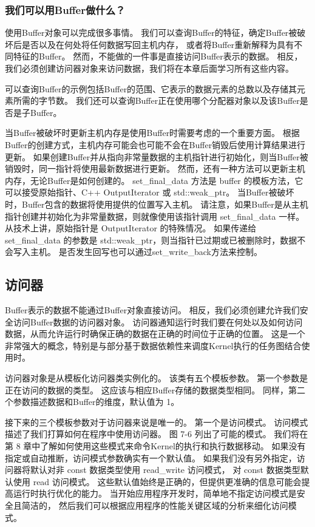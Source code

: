 \subsubsection{我们可以用Buffer做什么？}
使用Buffer对象可以完成很多事情。 我们可以查询Buffer的特征，确定Buffer被破坏后是否以及在何处将任何数据写回主机内存，
或者将Buffer重新解释为具有不同特征的Buffer。 然而，不能做的一件事是直接访问Buffer表示的数据。 
相反，我们必须创建访问器对象来访问数据，我们将在本章后面学习所有这些内容。

可以查询Buffer的示例包括Buffer的范围、它表示的数据元素的总数以及存储其元素所需的字节数。 
我们还可以查询Buffer正在使用哪个分配器对象以及该Buffer是否是子Buffer。

当Buffer被破坏时更新主机内存是使用Buffer时需要考虑的一个重要方面。 
根据Buffer的创建方式，主机内存可能会也可能不会在Buffer销毁后使用计算结果进行更新。 
如果创建Buffer并从指向非常量数据的主机指针进行初始化，则当Buffer被销毁时，同一指针将使用最新数据进行更新。 
然而，还有一种方法可以更新主机内存，无论Buffer是如何创建的。 
set\_final\_data 方法是 buffer 的模板方法，它可以接受原始指针、C++ OutputIterator 或 std::weak\_ptr。 
当Buffer被破坏时，Buffer包含的数据将使用提供的位置写入主机。 
请注意，如果Buffer是从主机指针创建并初始化为非常量数据，则就像使用该指针调用 set\_final\_data 一样。 
从技术上讲，原始指针是 OutputIterator 的特殊情况。 
如果传递给 set\_final\_data 的参数是 std::weak\_ptr，则当指针已过期或已被删除时，数据不会写入主机。 
是否发生回写也可以通过set\_write\_back方法来控制。

\subsection{访问器}
Buffer表示的数据不能通过Buffer对象直接访问。 相反，我们必须创建允许我们安全访问Buffer数据的访问器对象。 
访问器通知运行时我们要在何处以及如何访问数据，从而允许运行时确保正确的数据在正确的时间位于正确的位置。 
这是一个非常强大的概念，特别是与部分基于数据依赖性来调度Kernel执行的任务图结合使用时。

访问器对象是从模板化访问器类实例化的。 该类有五个模板参数。 第一个参数是正在访问的数据的类型。 
这应该与相应Buffer存储的数据类型相同。 同样，第二个参数描述数据和Buffer的维度，默认值为 1。

接下来的三个模板参数对于访问器来说是唯一的。 第一个是访问模式。 访问模式描述了我们打算如何在程序中使用访问器。 
图 7-6 列出了可能的模式。 我们将在第 8 章中了解如何使用这些模式来命令Kernel的执行和执行数据移动。
如果没有指定或自动推断，访问模式参数确实有一个默认值。 
如果我们没有另外指定，访问器将默认对非 const 数据类型使用 read\_write 访问模式，
对 const 数据类型默认使用 read 访问模式。 
这些默认值始终是正确的，但提供更准确的信息可能会提高运行时执行优化的能力。 
当开始应用程序开发时，简单地不指定访问模式是安全且简洁的，
然后我们可以根据应用程序的性能关键区域的分析来细化访问模式。


